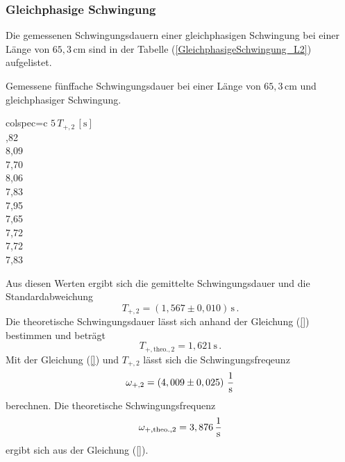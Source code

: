 \subsubsection{Gleichphasige Schwingung}
\label{sec:GleichphasigeSchwingung_LangesPendel}
Die gemessenen Schwingungsdauern einer gleichphasigen Schwingung bei einer Länge von $65,3\, \unit{\centi\meter}$ sind in der Tabelle (\ref{GleichphasigeSchwingung_L2})
aufgelistet. 
\begin{table}[H]
  \centering
  \caption{Gemessene fünffache Schwingungsdauer bei einer Länge von $65,3\, \unit{\centi\meter}$ und gleichphasiger Schwingung.}
  \label{tab:GleichphasigeSchwingung_L2}
  \begin{tblr}{colspec={c}}
      \toprule
      $5\, T_{+, 2}\,\left[\unit{\second}\right]$\\
      ,82 \\
      8,09 \\
      7,70 \\
      8,06 \\
      7,83 \\
      7,95 \\
      7,65 \\
      7,72 \\
      7,72 \\
      7,83 \\
      \bottomrule
  \end{tblr}
\end{table}
Aus diesen Werten ergibt sich die gemittelte Schwingungsdauer und die Standardabweichung
$$T_{+,2} = \left( 1,567 \pm 0,010 \right)\, \unit{\second}\,.$$
Die theoretische Schwingungsdauer lässt sich anhand der Gleichung (\ref{}) bestimmen und beträgt
$$T_{+,\text{theo.},2} = 1,621\, \unit{\second}\,.$$
Mit der Gleichung (\ref{}) und $T_{+,2}$ lässt sich die Schwingungsfreqeunz
$$\omega_{+,2} = \left( 4,009 \pm 0,025 \right)\, \unit[per-mode=fraction]{\per\second}$$ berechnen. 
Die theoretische Schwingungsfrequenz 
$$\omega_{+,\text{theo.},2} = 3,876 \, \unit[per-mode=fraction]{\per\second}$$ ergibt sich aus der Gleichung (\ref{}).
%
%
